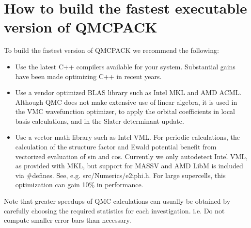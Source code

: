 \section{How to build the fastest executable version of QMCPACK}
\label{sec:buildperformance}
To build the fastest version of QMCPACK we recommend the following:
\begin{itemize}
\item Use the latest C++ compilers available for your
  system. Substantial gains have been made optimizing C++ in recent
  years.
\item Use a vendor optimized BLAS library such as Intel MKL and AMD ACML. Although
  QMC does not make extensive use of linear algebra, it is used in the
  VMC wavefunction optimizer, to apply the orbital coefficients in local basis
  calculations, and in the Slater determinant update.
\item Use a vector math library such as Intel VML.  For periodic
  calculations, the calculation of the structure factor and Ewald
  potential benefit from vectorized evaluation of sin and
  cos. Currently we only autodetect Intel VML, as provided with MKL,
  but support for MASSV and AMD LibM is included via \#defines. See,
  e.g. src/Numerics/e2iphi.h. For
  large supercells, this optimization can gain 10\% in performance.
\end{itemize}

Note that greater speedups of QMC calculations can usually be obtained by
carefully choosing the required statistics for each
investigation. i.e. Do not compute smaller error bars than necessary.

